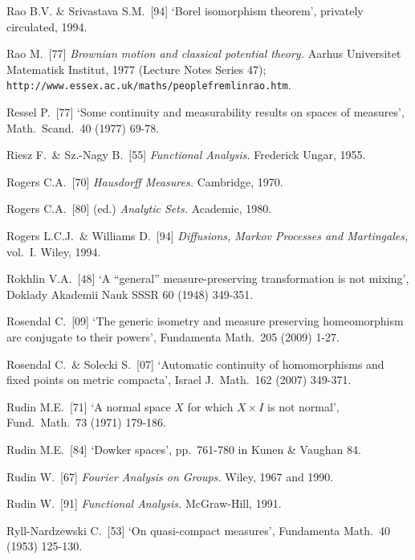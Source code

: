 {Rao B.V. \& Srivastava S.M.\ [94] `Borel isomorphism theorem',
privately circulated, 1994.
\cmmnt{[424C.]}

Rao M.\ [77] {\it Brownian motion and classical potential theory.}
Aarhus Universitet Matematisk Institut, 1977 (Lecture Notes Series 47);
{\tt http://www.essex.ac.uk/maths/people{\bsp}fremlin{\bsp}rao.htm}.

Ressel P.\ [77] `Some continuity and measurability results on spaces of
measures', Math.\ Scand.\ 40 (1977) 69-78.
\cmmnt{[417C, 437M.]}

Riesz F.\ \& Sz.-Nagy B.\ [55] {\it Functional Analysis.}  Frederick Ungar,
1955.
\cmmnt{[\S494 {\it notes\/}.]}

Rogers C.A.\ [70] {\it Hausdorff Measures.}   Cambridge, 1970.
\cmmnt{[\S471 {\it notes\/}.]}

Rogers C.A.\ [80] (ed.) {\it Analytic Sets.}   Academic, 1980.

Rogers L.C.J.\ \& Williams D.\ [94] {\it Diffusions, Markov Processes
and Martingales,} vol.\ I.   Wiley, 1994.
\cmmnt{[\S455 {\it notes\/}.]}

Rokhlin V.A.\ [48] `A ``general'' measure-preserving transformation is not
mixing', Doklady Akademii Nauk SSSR 60 (1948) 349-351.
\cmmnt{[494E.]}

Rosendal C.\ [09]
`The generic isometry and measure preserving homeomorphism are conjugate
to their powers',  Fundamenta Math.\ 205 (2009) 1-27.
\cmmnt{[494Ye.]}

Rosendal C.\ \& Solecki S.\ [07] `Automatic continuity of homomorphisms and
fixed points on metric compacta', Israel J.\ Math.\ 162 (2007) 349-371.
\cmmnt{[494Z, \S494 {\it notes}.]}

Rudin M.E.\ [71] `A normal space $X$ for which $X\times I$ is not
normal', Fund.\ Math.\ 73 (1971) 179-186.
\cmmnt{[439O.]}

Rudin M.E.\ [84] `Dowker spaces', pp.\ 761-780 in
{\smc Kunen \& Vaughan 84}.
\cmmnt{[439O.]}

Rudin W.\ [67] {\it Fourier Analysis on Groups.} Wiley, 1967 and 1990.
\cmmnt{[\S445 {\it intro\/}.]}

Rudin W.\ [91] {\it Functional Analysis.}  McGraw-Hill, 1991.
\cmmnt{[\S4A4, \S4A6.]}

Ryll-Nardzewski C.\ [53] `On quasi-compact measures', Fundamenta Math.\
40 (1953) 125-130.
\cmmnt{[451C.]}

}
